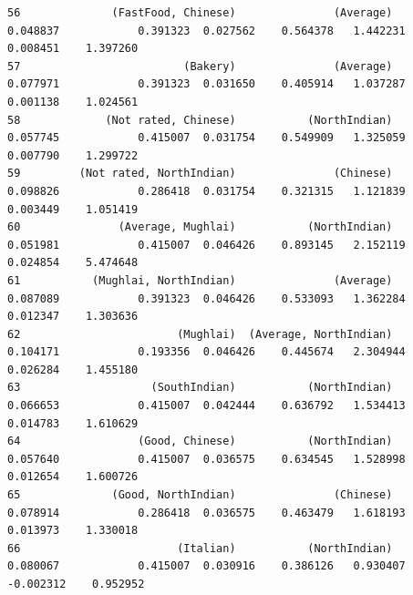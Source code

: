 \documentclass[11pt]{article} %
\begin{document}
\begin{lstlisting}
56              (FastFood, Chinese)               (Average)            0.048837            0.391323  0.027562    0.564378   1.442231  0.008451    1.397260
57                         (Bakery)               (Average)            0.077971            0.391323  0.031650    0.405914   1.037287  0.001138    1.024561
58             (Not rated, Chinese)           (NorthIndian)            0.057745            0.415007  0.031754    0.549909   1.325059  0.007790    1.299722
59         (Not rated, NorthIndian)               (Chinese)            0.098826            0.286418  0.031754    0.321315   1.121839  0.003449    1.051419
60               (Average, Mughlai)           (NorthIndian)            0.051981            0.415007  0.046426    0.893145   2.152119  0.024854    5.474648
61           (Mughlai, NorthIndian)               (Average)            0.087089            0.391323  0.046426    0.533093   1.362284  0.012347    1.303636
62                        (Mughlai)  (Average, NorthIndian)            0.104171            0.193356  0.046426    0.445674   2.304944  0.026284    1.455180
63                    (SouthIndian)           (NorthIndian)            0.066653            0.415007  0.042444    0.636792   1.534413  0.014783    1.610629
64                  (Good, Chinese)           (NorthIndian)            0.057640            0.415007  0.036575    0.634545   1.528998  0.012654    1.600726
65              (Good, NorthIndian)               (Chinese)            0.078914            0.286418  0.036575    0.463479   1.618193  0.013973    1.330018
66                        (Italian)           (NorthIndian)            0.080067            0.415007  0.030916    0.386126   0.930407 -0.002312    0.952952


\end{lstlisting}
\end{document}
